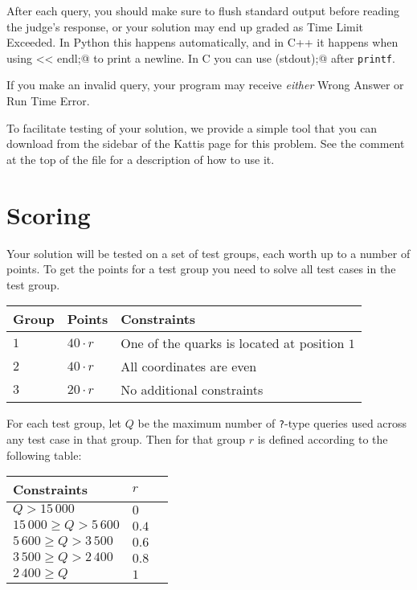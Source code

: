 After each query, you should make sure to flush standard output before reading the judge's response, or your solution may end up graded as Time Limit Exceeded.
In Python this happens automatically, and in C++ it happens when using \verb@cout << endl;@ to print a newline.
In C you can use \verb@fflush(stdout);@ after \texttt{printf}.

If you make an invalid query, your program may receive \emph{either} Wrong Answer or Run Time Error.

To facilitate testing of your solution, we provide a simple tool that you can download from the sidebar of the Kattis page for this problem.
See the comment at the top of the file for a description of how to use it.

\section*{Scoring}
Your solution will be tested on a set of test groups, each worth up to a number of points.
To get the points for a test group you need to solve all test cases in the test group.

\noindent
\begin{tabular}{| l | l | l |}
  \hline
  Group & Points       & Constraints \\ \hline
  $1$   & $40 \cdot r$ & One of the quarks is located at position $1$ \\ \hline
  $2$   & $40 \cdot r$ & All coordinates are even \\ \hline
  $3$   & $20 \cdot r$ & No additional constraints \\ \hline
\end{tabular}

For each test group, let $Q$ be the maximum number of \texttt{?}-type queries used across any test case in that group.
Then for that group $r$ is defined according to the following table:

\noindent
\begin{tabular}{| l | l | l |}
  \hline
  Constraints                & $r$ \\ \hline
  $             Q > 15\,000$ & $0$ \\ \hline
  $ 15\,000 \ge Q > 5\,600$  & $0.4$  \\ \hline
  $  5\,600 \ge Q > 3\,500$  & $0.6$  \\ \hline
  $  3\,500 \ge Q > 2\,400$  & $0.8$  \\ \hline
  $  2\,400 \ge Q$           & $1$  \\ \hline
\end{tabular}
